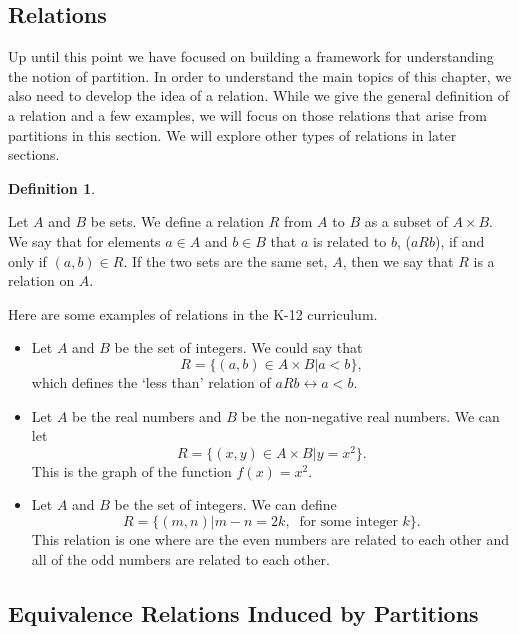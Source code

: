 \documentclass[
]{book}
\theoremstyle{definition}
\newtheorem{definition}{Definition}[chapter]
\theoremstyle{definition}
\theoremstyle{definition}
\theoremstyle{definition}
\theoremstyle{remark}
\begin{document}
\hypertarget{relations}{%
\subsection{Relations}\label{relations}}

Up until this point we have focused on building a framework for understanding the notion of partition. In order to understand the main topics of this chapter, we also need to develop the idea of a relation. While we give the general definition of a relation and a few examples, we will focus on those relations that arise from partitions in this section. We will explore other types of relations in later sections.

\begin{definition}
\protect\hypertarget{def:relation}{}\label{def:relation}

Let \(A\) and \(B\) be sets. We define a relation \(R\) from \(A\) to \(B\) as a subset of \(A\times B\). We say that for elements \(a\in A\) and \(b\in B\) that \(a\) is related to \(b\), (\(aRb\)), if and only if \((a,b)\in R\). If the two sets are the same set, \(A\), then we say that \(R\) is a relation on \(A\).

\end{definition}

Here are some examples of relations in the K-12 curriculum.

\begin{itemize}
\item
  Let \(A\) and \(B\) be the set of integers. We could say that \[R=\{(a,b)\in A\times B \vert a<b\},\] which defines the `less than' relation of \(aRb \leftrightarrow a<b\).
\item
  Let \(A\) be the real numbers and \(B\) be the non-negative real numbers. We can let \[R=\{(x,y)\in A\times B \vert y=x^2\}.\] This is the graph of the function \(f(x)=x^2\).
\item
  Let \(A\) and \(B\) be the set of integers. We can define \[R= \{(m,n) \vert m-n=2k, \: \mbox{ for some integer } k\}.\] This relation is one where are the even numbers are related to each other and all of the odd numbers are related to each other.
\end{itemize}

\hypertarget{equivalence-relations-induced-by-partitions}{%
\subsection{Equivalence Relations Induced by Partitions}\label{equivalence-relations-induced-by-partitions}}
\end{document}
